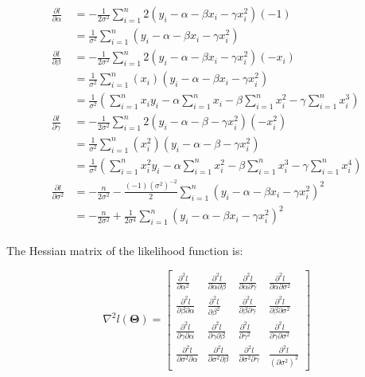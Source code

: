 \begin{align*}
	\frac{\partial l}{\partial \alpha} &= -\frac{1 }{2 \sigma^{2 }} \sum^{n }_{i=1 }2(y_{i }-\alpha-\beta x_{i }-\gamma x_{i }^{2}) (-1)\\
	&= \frac{1 }{\sigma^{2 }} \sum^{n }_{i=1 }(y_{i }-\alpha-\beta x_{i }-\gamma x_{i }^{2})\\
	\frac{\partial l}{\partial \beta} &= -\frac{1}{2\sigma^{2}} \sum^{n }_{i=1 }2(y_{i }-\alpha-\beta x_{i }-\gamma x_{i }^{2 })(-x_{i})\\
&= \frac{1}{\sigma^{2}} \sum^{n }_{i=1 }(x_{i})(y_{i }-\alpha-\beta x_{i }-\gamma x_{i }^{2 })\\
&= \frac{1}{\sigma^{2}}\left( \sum^{n }_{i=1 }x_{i }y_{i } -\alpha\sum^{n }_{i=1 }x_{i} -\beta \sum^{n }_{i=1 }x_{i }^{2} -\gamma \sum^{n }_{i=1}x_{i }^{3}\right)\\
	\frac{\partial l}{\partial \gamma} &= -\frac{1 }{2 \sigma^{2 }} \sum^{n }_{i=1 }2(y_{i }-\alpha-\beta-\gamma x_{i }^{2})(-x_{i }^{2})\\
 &= \frac{1 }{\sigma^{2 }} \sum^{n }_{i=1 }(x_{i }^{2})(y_{i }-\alpha-\beta-\gamma x_{i }^{2})\\
 &= \frac{1 }{\sigma^{2 }} \left(\sum^{n }_{i=1 }x_{i }^{2}y_{i} -\alpha \sum^{n }_{i=1 }x_{i }^{2} - \beta \sum^{n }_{i=1 }x_{i }^{3} - \gamma \sum^{n }_{i=1 }x_{i }^{4} \right)\\
	\frac{\partial l}{\partial \sigma^{2}} &= - \frac{n }{2 \sigma^{2 }} - \frac{(-1)(\sigma^{2 })^{-2} }{2 } \sum^{n }_{i=1 }(y_{i }- \alpha - \beta x_{i }- \gamma x_{i }^{2 })^{2}\\
&= - \frac{n }{2 \sigma^{2 }} + \frac{1}{2\sigma^{4}} \sum^{n }_{i=1 }(y_{i }- \alpha - \beta x_{i }- \gamma x_{i }^{2 })^{2}\\
\end{align*}

The Hessian matrix of the likelihood function is:

\[
	\nabla^{2}l(\boldsymbol{\Theta}) = \begin{bmatrix}
		\frac{\partial^{2}l}{\partial \alpha^{2}} &
		\frac{\partial^{2}l}{\partial \alpha \partial \beta} &
		\frac{\partial^{2}l}{\partial \alpha \partial \gamma} &
		\frac{\partial^{2}l}{\partial \alpha \partial \sigma^{2}} \\
		\frac{\partial^{2}l}{\partial \beta \partial \alpha} &
		\frac{\partial^{2}l}{\partial \beta^{2} } &
		\frac{\partial^{2}l}{\partial \beta \partial \gamma} &
		\frac{\partial^{2}l}{\partial \beta \partial \sigma^{2}} \\
		\frac{\partial^{2}l}{\partial \gamma \partial \alpha} &
		\frac{\partial^{2}l}{\partial \gamma \partial \beta} &
		\frac{\partial^{2}l}{\partial \gamma^{2} } &
		\frac{\partial^{2}l}{\partial \gamma \partial \sigma^{2}} \\
		\frac{\partial^{2}l}{\partial \sigma^{2} \partial \alpha} &
		\frac{\partial^{2}l}{\partial \sigma^{2} \partial \beta} &
		\frac{\partial^{2}l}{\partial \sigma^{2} \partial \gamma} &
		\frac{\partial^{2}l}{(\partial \sigma^{2})^{2} }
	\end{bmatrix}
\]

